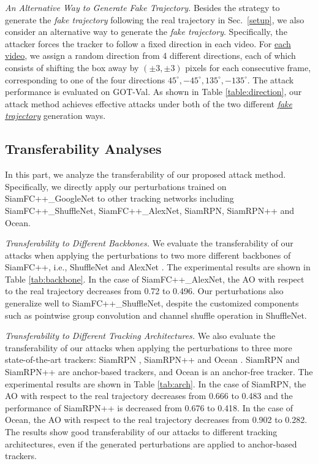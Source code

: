 \documentclass[journal]{IEEEtran}
\newcommand{\ie}{i.e.}
\begin{document}
\textit{An Alternative Way to Generate Fake Trajectory.} Besides the strategy to generate the \textit{fake trajectory} following the real trajectory in Sec.~\ref{setup}, we also consider an alternative way to generate the \textit{fake trajectory}. Specifically, the attacker forces the tracker to follow a fixed direction in each video. For \uline{each video}, we assign a random direction from 4 different directions, each of which consists of shifting the box away by $(\pm 3, \pm 3)$ pixels for each consecutive frame, corresponding to one of the four directions $45^{\circ}, -45^{\circ}, 135^{\circ}, -135^{\circ}$. The attack performance is evaluated on GOT-Val. As shown in Table \ref{table:direction}, our attack method achieves effective attacks under both of the two different \uline{\textit{fake trajectory}} generation ways.

\subsection{Transferability Analyses}

In this part, we analyze the transferability of our proposed attack method. Specifically, we directly apply our perturbations trained on SiamFC++\_GoogleNet to other tracking networks including SiamFC++\_ShuffleNet, SiamFC++\_AlexNet, SiamRPN, SiamRPN++ and Ocean.


\textit{Transferability to Different Backbones.} We evaluate the transferability of our attacks when applying the perturbations to two more different backbones of SiamFC++, \ie, ShuffleNet \cite{ShuffleNet} and AlexNet \cite{AlexNet}.
The experimental results are shown in Table \ref{tab:backbone}. In the case of SiamFC++\_AlexNet, the AO with respect to the real trajectory decreases from 0.72 to 0.496. Our perturbations also generalize well to SiamFC++\_ShuffleNet, despite the customized components such as pointwise group convolution and channel shuffle operation in ShuffleNet.

\textit{Transferability to Different Tracking Architectures.} We also evaluate the transferability of our attacks when applying the perturbations to three more state-of-the-art trackers: SiamRPN \cite{SiamRPN}, SiamRPN++ \cite{SiamRPN++} and Ocean \cite{zhang2020ocean}. SiamRPN and SiamRPN++ are anchor-based trackers, and Ocean is an anchor-free tracker. The experimental results are shown in Table \ref{tab:arch}. In the case of SiamRPN, the AO with respect to the real trajectory decreases from 0.666 to 0.483 and the performance of SiamRPN++ is decreased from 0.676 to 0.418. In the case of Ocean, the AO with respect to the real trajectory decreases from 0.902 to 0.282. The results show good transferability of our attacks to different tracking architectures, even if the generated perturbations are applied to anchor-based trackers.
\end{document}
